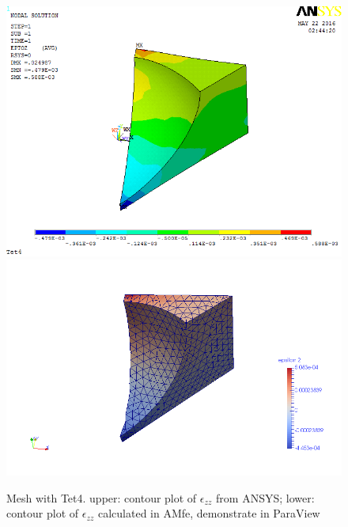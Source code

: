 \begin{figure}[htbp]
	\begin{center}
		\includegraphics[width=13cm,clip]{Tet4Ezz.png} 		
		\includegraphics[width=13cm,clip]{Tet4EzzP.png} 		
		\caption{Mesh with Tet4. upper: contour plot of $\epsilon_{zz}$ from ANSYS; lower: contour plot of $\epsilon_{zz}$ calculated in AMfe, demonstrate in ParaView} \label{fig: Tet4Ezz}
	\end{center}
\end{figure}
\clearpage 

